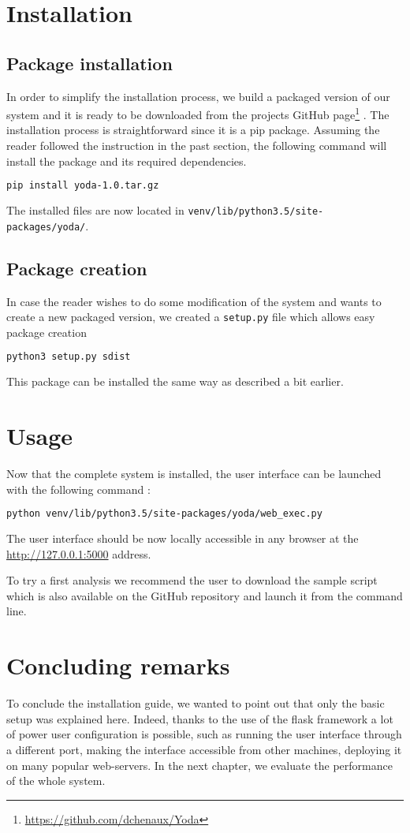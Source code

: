 \section{Installation}
\subsection{Package installation}
In order to simplify the installation process, we build a packaged version of our system and it is ready to be downloaded from the projects GitHub page\footnote{\url{https://github.com/dchenaux/Yoda}} . The installation process is straightforward since it is a \gls{pip} package. Assuming the reader followed the instruction in the past section, the following command will install the package and its required dependencies. 
\smallskip
\begin{lstlisting}[language=bash]
pip install yoda-1.0.tar.gz
\end{lstlisting}

The installed files are now located in \texttt{venv/lib/python3.5/site-packages/yoda/}.

\subsection{Package creation}
In case the reader wishes to do some modification of the system and wants to create a new packaged version, we created a \texttt{setup.py} file which allows easy package creation
\smallskip
\begin{lstlisting}[language=bash]
python3 setup.py sdist
\end{lstlisting}

This package can be installed the same way as described a bit earlier.

\section{Usage}
Now that the complete system is installed, the user interface can be launched with the following command :
\smallskip
\begin{lstlisting}[language=bash]
python venv/lib/python3.5/site-packages/yoda/web_exec.py
\end{lstlisting}
The user interface should be now locally accessible in any browser at the \url{http://127.0.0.1:5000} address.

To try a first analysis we recommend the user to download the sample script which is also available on the GitHub repository and launch it from the command line.

\section{Concluding remarks}
To conclude the installation guide, we wanted to point out that only the basic setup was explained here. Indeed, thanks to the use of the flask framework a lot of power user configuration is possible, such as running the user interface through a different port, making the interface accessible from other machines, deploying it on many popular web-servers. In the next chapter, we evaluate the performance of the whole system.
